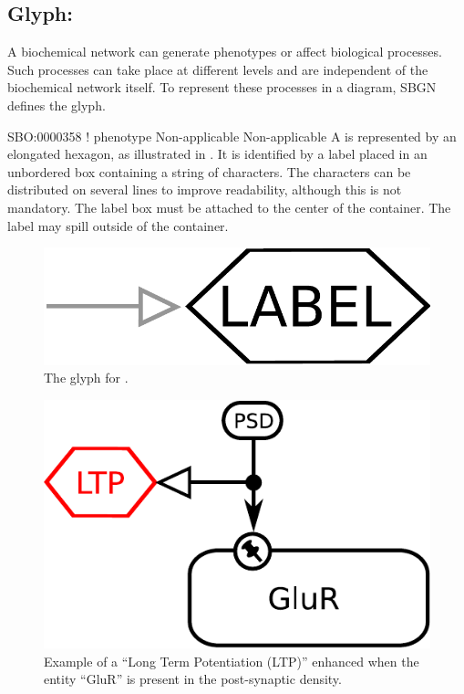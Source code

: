 
\color{blue}

\subsection{Glyph: }
\label{sec:phenotype}

A biochemical network can generate phenotypes or affect biological
processes.  Such processes can take place at different levels and are
independent of the biochemical network itself.  To represent these
processes in a diagram, SBGN defines the  glyph.

\begin{glyphDescription}

\glyphSboTerm SBO:0000358 ! phenotype
\glyphOrigin Non-applicable
\glyphTarget Non-applicable
\glyphEndPoint A  is represented by an elongated
hexagon, as illustrated in . It is identified by a label placed in an
unbordered box containing a string of characters.  The characters can be
distributed on several lines to improve readability, although this is not
mandatory.  The label box must be attached to the center of the
 container.  The label may spill outside of the container.

\end{glyphDescription}
 
\begin{figure}[H]
  \centering
  \includegraphics[scale = 0.3]{images/phenotype}
  \caption{The \ER glyph for .}
  \label{fig:phenotype}
\end{figure}

\begin{figure}[H]
  \centering
  \includegraphics[scale = 0.5]{examples/ex-phenotype}
  \caption{Example of a  ``Long Term Potentiation (LTP)'' enhanced when the entity ``GluR'' is present in the post-synaptic density.}
  \label{fig:ex-phenotype}
\end{figure}

\normalcolor
